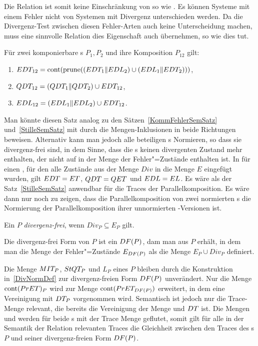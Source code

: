 Die Relation\DRel{} ist somit keine Einschränkung von \ERel{} so wie \QRel{}.
Es können Systeme mit einem Fehler nicht von Systemen mit Divergenz
unterschieden werden. Da die Divergenz-Test zwischen diesen \glqq
Fehler-Arten\grqq{} auch keine Unterscheidung machen, muss eine sinnvolle
Relation dies Eigenschaft auch übernehmen, so wie \DRel{} dies tut.

\begin{Satz}
  \label{DivSemSatz}
  Für zwei komponierbare \MEIO{}s $P_1,P_2$ und ihre Komposition $P_{12}$ gilt:
  \begin{enumerate}
    \item $EDT _{12} =\mathrm{cont} (\mathrm{prune} ((EDT _1\|EDL _2)\cup (EDL _1\|EDT
      _2)))$,
    \item $QDT _{12} =(QDT _1\|QDT _2)\cup EDT _{12}$,
    \item $EDL _{12} =(EDL _1\|EDL _2)\cup EDT _{12}$.
  \end{enumerate}
\end{Satz}

Man könnte diesen Satz analog zu den Sätzen~\ref{KommFehlerSemSatz}
und~\ref{StilleSemSatz} mit durch die Mengen-Inklusionen in beide Richtungen
beweisen. Alternativ kann man jedoch alle beteiligen \MEIO{}s Normieren, so
dass sie divergenz-frei sind, in dem Sinne, dass die \MEIO{}s keinen
divergenten Zustand mehr enthalten, der nicht auf in der Menge der
Fehler"=Zustände enthalten ist. In für einen \MEIO{}, für den alle Zustände aus
der Menge $Div$ in die Menge $E$ eingefügt wurden, gilt $EDT = ET$, $QDT =
QET$ und $EDL = EL$. Es wäre als der Satz~\ref{StilleSemSatz} anwendbar für
die Traces der Parallelkomposition. Es wäre dann nur noch zu zeigen, dass die
Parallelkomposition von zwei normierten \MEIO{}s die Normierung der
Parallelkomposition ihrer unnormierten \MEIO{}-Versionen ist.

\begin{Def}
  \label{DivNormDef}
  Ein \MEIO{} $P$ \emph{divergenz-frei}, wenn $Div _P \subseteq E_P$ gilt.

  Die divergenz-frei Form von $P$ ist ein \MEIO{} $DF (P)$, dam man aus $P$
  erhält, in dem man die Menge der Fehler"=Zustände $E_{DF (P)}$ als die Menge
  $E_P \cup Div _P$ definiert.
\end{Def}

Die Menge $MIT _P$, $StQT _P$ und $L_P$ eines \MEIO{} $P$ bleiben durch die
Konstruktion in~\ref{DivNormDef} zur divergenz-freien Form $DF (P)$
unverändert. Nur die Menge $\mathrm{cont} (PrET) _P$ wird zur Menge $\mathrm{cont} (PrET
_{DF (P)})$ erweitert, in dem eine Vereinigung mit $DT _P$ vorgenommen wird.
Semantisch ist jedoch nur die Trace-Menge \EDT{} relevant, die bereits die
Vereinigung der Menge \ET{} und $DT{}$ ist. Die Mengen \QDT{} und \EDL{}
werden für beide \MEIO{}s mit der Trace Menge \EDT{} geflutet, somit gilt für
alle in der Semantik der Relation \DRel{} relevanten Traces die Gleichheit
zwischen den Traces des \MEIO{}s $P$ und seiner divergenz-freien Form $DF
(P)$.


